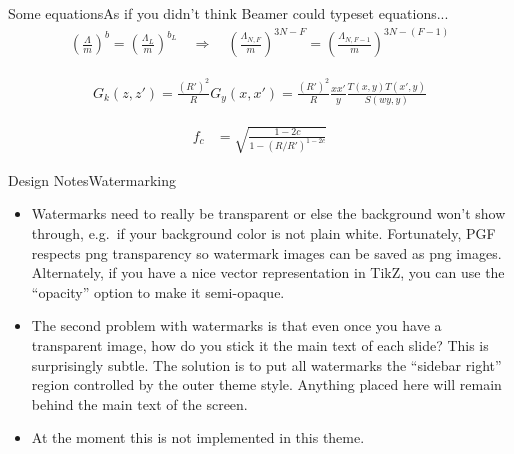 \begin{frame}[c]{Some equations}{As if you didn't think Beamer could typeset equations...}
	\begin{align*}
		\left(\frac{\Lambda}{m}\right)^b = \left(\frac{\Lambda_L}{m}\right)^{b_L} \quad\Rightarrow\quad \left(\frac{\Lambda_{N,F}}{m}\right)^{3N-F}=\left(\frac{\Lambda_{N,F-1}}{m}\right)^{3N-(F-1)}
	\end{align*}	
	
	\begin{align*}
		G_k(z,z') = \frac{(R')^2}{R} G_y(x,x') = \frac{(R')^2}{R} \frac{xx'}{y} \frac{T(x,y)T(x',y)}{S(wy,y)}
	\end{align*}

	\begin{align*}
	f_c &=\sqrt{\frac{1-2c}{1-(R/R')^{1-2c}}}
	\end{align*}

\end{frame}






\begin{frame}[t]{Design Notes}{Watermarking}
	\begin{itemize}
		\item Watermarks need to really be \alert{transparent} or else the background won't show through, e.g.\ if your background color is not plain white. Fortunately, PGF respects png transparency so watermark images can be saved as png images. Alternately, if you have a nice vector representation in TikZ, you can use the ``opacity'' option to make it semi-opaque.
		\item The second problem with watermarks is that even once you have a transparent image, how do you stick it  the main text of each slide? This is surprisingly subtle. The solution is to put all watermarks the ``sidebar right'' region controlled by the outer theme style. Anything placed here will remain \alert{behind} the main text of the screen.
		\item At the moment this is not implemented in this theme.
	\end{itemize}
\end{frame}





